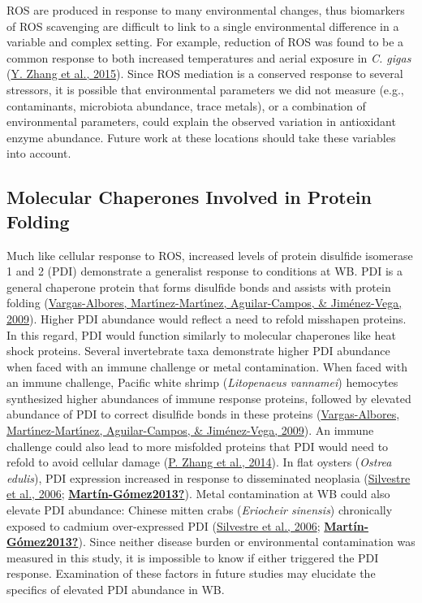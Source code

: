 \documentclass [11pt, proquest] {uwthesis}[2015/03/03]
\begin{document}
ROS are produced in response to many environmental changes, thus biomarkers of ROS scavenging are difficult to link to a single environmental difference in a variable and complex setting. For example, reduction of ROS was found to be a common response to both increased temperatures and aerial exposure in \emph{C. gigas} (\protect\hyperlink{ref-Zhang2015}{Y. Zhang et al., 2015}). Since ROS mediation is a conserved response to several stressors, it is possible that environmental parameters we did not measure (e.g., contaminants, microbiota abundance, trace metals), or a combination of environmental parameters, could explain the observed variation in antioxidant enzyme abundance. Future work at these locations should take these variables into account.

\hypertarget{molecular-chaperones-involved-in-protein-folding}{%
\subsection{Molecular Chaperones Involved in Protein Folding}\label{molecular-chaperones-involved-in-protein-folding}}

Much like cellular response to ROS, increased levels of protein disulfide isomerase 1 and 2 (PDI) demonstrate a generalist response to conditions at WB. PDI is a general chaperone protein that forms disulfide bonds and assists with protein folding (\protect\hyperlink{ref-Vargas-Albores2009}{Vargas-Albores, Martı́nez-Martı́nez, Aguilar-Campos, \& Jiménez-Vega, 2009}). Higher PDI abundance would reflect a need to refold misshapen proteins. In this regard, PDI would function similarly to molecular chaperones like heat shock proteins. Several invertebrate taxa demonstrate higher PDI abundance when faced with an immune challenge or metal contamination. When faced with an immune challenge, Pacific white shrimp (\emph{Litopenaeus vannamei}) hemocytes synthesized higher abundances of immune response proteins, followed by elevated abundance of PDI to correct disulfide bonds in these proteins (\protect\hyperlink{ref-Vargas-Albores2009}{Vargas-Albores, Martı́nez-Martı́nez, Aguilar-Campos, \& Jiménez-Vega, 2009}). An immune challenge could also lead to more misfolded proteins that PDI would need to refold to avoid cellular damage (\protect\hyperlink{ref-Zhang2014}{P. Zhang et al., 2014}). In flat oysters (\emph{Ostrea edulis}), PDI expression increased in response to disseminated neoplasia (\protect\hyperlink{ref-Silvestre2006}{Silvestre et al., 2006}; \protect\hyperlink{ref-Martuxedn-Guxf3mez2013}{\textbf{Martín-Gómez2013?}}). Metal contamination at WB could also elevate PDI abundance: Chinese mitten crabs (\emph{Eriocheir sinensis}) chronically exposed to cadmium over-expressed PDI (\protect\hyperlink{ref-Silvestre2006}{Silvestre et al., 2006}; \protect\hyperlink{ref-Martuxedn-Guxf3mez2013}{\textbf{Martín-Gómez2013?}}). Since neither disease burden or environmental contamination was measured in this study, it is impossible to know if either triggered the PDI response. Examination of these factors in future studies may elucidate the specifics of elevated PDI abundance in WB.
\end{document}
